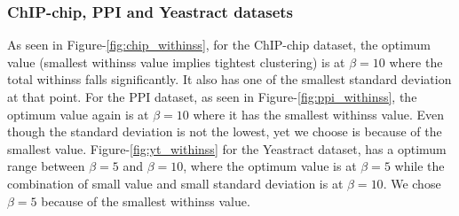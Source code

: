 \subsubsection{ChIP-chip, PPI and Yeastract datasets}
As seen in Figure-\ref{fig:chip_withinss}, for the ChIP-chip dataset, the optimum value (smallest withinss value implies tightest clustering) is at $\beta=10$ where the total 
withinss falls significantly. It also has one of the smallest standard deviation at that point. For the PPI dataset, as seen in Figure-\ref{fig:ppi_withinss}, the optimum 
value again is at $\beta=10$ where it has the smallest withinss value. Even though the standard deviation is not the lowest, yet we choose is because of the smallest value.
Figure-\ref{fig:yt_withinss} for the Yeastract dataset, has a optimum range between $\beta=5$ and $\beta=10$, where the optimum value is at $\beta=5$ while the combination of small value and small standard deviation 
is at $\beta=10$. We chose $\beta=5$ because of the smallest withinss value.    


